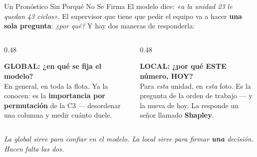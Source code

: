 \documentclass[aspectratio=169, 11pt]{beamer}
\begin{document}
\begin{frame}[shrink=8]{Un Pronóstico Sin Porqué No Se Firma}
  \vspace{2pt}
  {\footnotesize\color{textMuted}
  El modelo dice: \emph{«a la unidad 23 le quedan 43 ciclos»}. El
  supervisor que tiene que pedir el equipo va a hacer \textbf{una sola
  pregunta}: \emph{¿por qué?} Y hay dos maneras de responderla:}
  \vspace{8pt}
  \begin{columns}[T]
    \begin{column}{0.48\textwidth}
      \begin{tcolorbox}[colback=arcaGray, colframe=arcaDark, boxrule=0pt, leftrule=3pt,
        arc=3pt, left=8pt, right=8pt, top=5pt, bottom=5pt]
        {\scriptsize\color{arcaDark}\bfseries\faGlobe\hspace{4pt}GLOBAL:
         ¿en qué se fija el modelo?}\\[5pt]
        {\scriptsize\color{textMuted}
         En general, en toda la flota. Ya la conocen: es la
         \textbf{importancia por permutación} de la C3 --- desordenar una
         columna y medir cuánto duele.}
      \end{tcolorbox}
    \end{column}
    \begin{column}{0.48\textwidth}
      \begin{tcolorbox}[colback=arcaGray, colframe=arcaRed, boxrule=0pt, leftrule=3pt,
        arc=3pt, left=8pt, right=8pt, top=5pt, bottom=5pt]
        {\scriptsize\color{arcaRed}\bfseries\faSearchLocation\hspace{4pt}LOCAL:
         ¿por qué ESTE número, HOY?}\\[5pt]
        {\scriptsize\color{textMuted}
         Para \emph{esta} unidad, en \emph{esta} foto. Es la pregunta de
         la orden de trabajo --- y la nueva de hoy. La responde un señor
         llamado \textbf{Shapley}.}
      \end{tcolorbox}
    \end{column}
  \end{columns}
  \vspace{8pt}
  {\scriptsize\color{arcaDark}\itshape
   La global sirve para confiar en el modelo. La local sirve para firmar
   \textbf{una} decisión. Hacen falta las dos.}
\end{frame}
\end{document}
